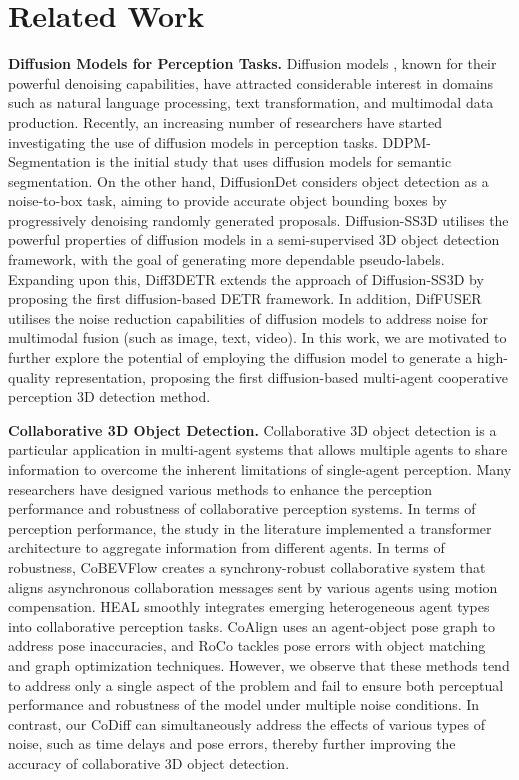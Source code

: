 \section{Related Work}
\textbf{Diffusion Models for Perception Tasks.}
Diffusion models \cite{D1,D2,D3,D4}, known for their powerful denoising capabilities, have attracted considerable interest in domains such as natural language processing, text transformation, and multimodal data production. Recently, an increasing number of researchers have started investigating the use of diffusion models in perception tasks. DDPM-Segmentation \cite{DDPMSegmentation} is the initial study that uses diffusion models for semantic segmentation. On the other hand, DiffusionDet \cite{DiffusionDet} considers object detection as a noise-to-box task, aiming to provide accurate object bounding boxes by progressively denoising randomly generated proposals. Diffusion-SS3D \cite{Diffusion-SS3D} utilises the powerful properties of diffusion models in a semi-supervised 3D object detection framework, with the goal of generating more dependable pseudo-labels. Expanding upon this, Diff3DETR \cite{diff3detr} extends the approach of Diffusion-SS3D by proposing the first diffusion-based DETR framework.
In addition, DifFUSER \cite{diffbev} utilises the noise reduction capabilities of diffusion models to address noise for multimodal fusion (such as image, text, video).
In this work, we are motivated to further explore the potential of employing
the diffusion model to generate a high-quality representation, proposing the first diffusion-based multi-agent cooperative perception 3D detection method.

\textbf{Collaborative 3D Object Detection.}
Collaborative 3D object detection \cite{syncnet,CoAlign,cobevt,v2x-vit,opv2v} is a particular application in multi-agent systems that allows multiple agents to share information to overcome the inherent limitations of single-agent perception.
Many researchers have designed various methods to enhance the perception performance and robustness of collaborative perception systems. 
In terms of perception performance, the study in the literature  \cite{cobevt,v2x-vit,opv2v,where2comm} implemented a transformer architecture to aggregate information from different agents.
In terms of robustness, CoBEVFlow\cite{CoBEVFlow} creates a synchrony-robust collaborative system that aligns asynchronous collaboration messages sent by various agents using motion compensation. HEAL\cite{HEAL} smoothly integrates  emerging heterogeneous agent types into collaborative perception tasks. CoAlign \cite{CoAlign} uses an agent-object pose graph to address pose inaccuracies, and RoCo \cite{roco} tackles  pose errors with object matching and graph optimization techniques.
However, we observe that these methods tend to address only a single aspect of the problem and fail to ensure both perceptual performance and robustness of the model under multiple noise conditions. In contrast, our CoDiff can simultaneously address the effects of various types of noise, such as time delays and pose errors, thereby further improving the accuracy of collaborative 3D object detection.



